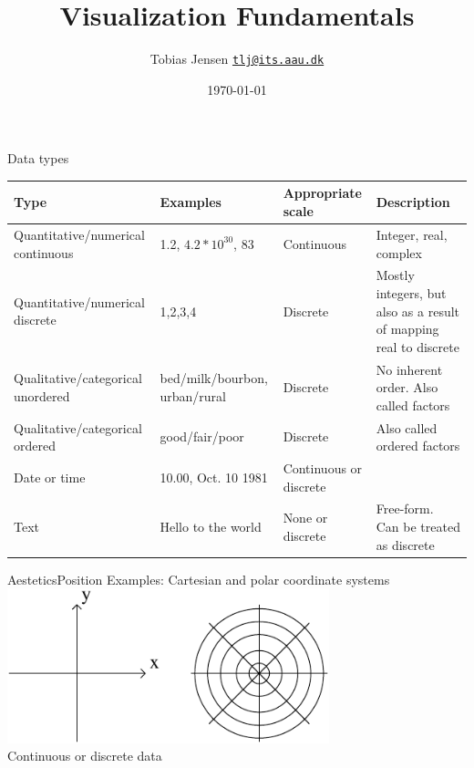 \documentclass[10pt]{beamer}
\title{Visualization Fundamentals}
\date{\today}
\author{
  Tobias Jensen
  \href{mailto:tlj@its.aau.dk}{{\tt tlj@its.aau.dk}} \\
}
\institute[
  Aalborg University\\
  Denmark
] %
{%
  Aalborg University\\
  Denmark
  
}
\begin{document}
{\aauwavesbg%
\begin{frame} %
  \titlepage
\end{frame}}




\begin{frame}{Data types}{}

  \scriptsize
  \begin{tabular}{|p{2.7cm}|p{2cm}|p{2cm}|p{3cm}|} \hline \hline
    Type & Examples & Appropriate scale & Description \\ \hline
Quantitative/numerical continuous & 1.2, $4.2*10^{30}$, 83 & Continuous & Integer, real, complex \\ \hline
Quantitative/numerical discrete & 1,2,3,4             & Discrete   & Mostly integers, but also as a result of mapping real to discrete \\ \hline
Qualitative/categorical unordered & bed/milk/bourbon, urban/rural & Discrete & No inherent order. Also called factors \\ \hline
Qualitative/categorical ordered & good/fair/poor & Discrete & Also called ordered factors \\ \hline
Date or time                    & 10.00, Oct. 10 1981 & Continuous or discrete & \\ \hline
Text                            & Hello to the world  & None or discrete & Free-form. Can be treated as discrete \\\hline \hline
\end{tabular}
\end{frame}


\begin{frame}{Aestetics}{Position}
\centering  Examples: Cartesian and polar coordinate systems\\[2em]
  \centering \includegraphics[width=0.7\textwidth]{pics/position.pdf}
  \\[2em]
  Continuous or discrete data
\end{frame}
\end{document}
